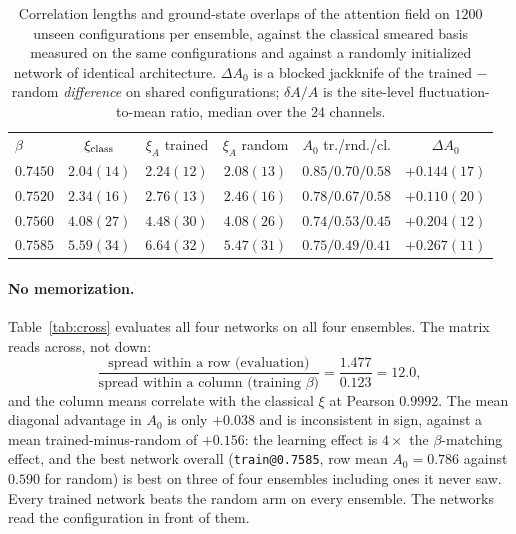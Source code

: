 \documentclass[aps,prl,reprint,superscriptaddress,nofootinbib]{revtex4-2}
\newcommand{\xiA}{\xi_A}
\begin{document}
\begin{table}[t]
\caption{Correlation lengths and ground-state overlaps of the attention field on
$1200$ unseen configurations per ensemble, against the classical smeared basis
measured on the same configurations and against a randomly initialized network
of identical architecture. $\Delta A_0$ is a blocked jackknife of the trained
$-$ random \emph{difference} on shared configurations; $\delta A/A$ is the
site-level fluctuation-to-mean ratio, median over the $24$ channels.}
\label{tab:z2}
\begin{ruledtabular}
\scriptsize
\setlength{\tabcolsep}{2.6pt}
\begin{tabular}{lccccc}
$\beta$ & $\xi_{\rm class}$ & $\xiA$ trained & $\xiA$ random
        & $A_0$ tr./rnd./cl. & $\Delta A_0$ \\
\colrule
$0.7450$ & $2.04(14)$ & $2.24(12)$ & $2.08(13)$ & $0.85/0.70/0.58$
  & $+0.144(17)$ \\
$0.7520$ & $2.34(16)$ & $2.76(13)$ & $2.46(16)$ & $0.78/0.67/0.58$
  & $+0.110(20)$ \\
$0.7560$ & $4.08(27)$ & $4.48(30)$ & $4.08(26)$ & $0.74/0.53/0.45$
  & $+0.204(12)$ \\
$0.7585$ & $5.59(34)$ & $6.64(32)$ & $5.47(31)$ & $0.75/0.49/0.41$
  & $+0.267(11)$ \\
\end{tabular}
\end{ruledtabular}
\end{table}

\paragraph{No memorization.} Table~\ref{tab:cross} evaluates all four networks
on all four ensembles. The matrix reads across, not down:
\begin{equation}
  \frac{\text{spread within a row (evaluation)}}
       {\text{spread within a column (training }\beta)}
  =\frac{1.477}{0.123}=\bm{12.0},
\end{equation}
and the column means correlate with the classical $\xi$ at Pearson $0.9992$. The
mean diagonal advantage in $A_0$ is only $+0.038$ and is inconsistent in sign,
against a mean trained-minus-random of $+0.156$: the learning effect is
$4\times$ the $\beta$-matching effect, and the best network overall
(\texttt{train@0.7585}, row mean $A_0=0.786$ against $0.590$ for random) is best
on three of four ensembles including ones it never saw. Every trained network
beats the random arm on every ensemble. The networks read the configuration in
front of them.
\end{document}
